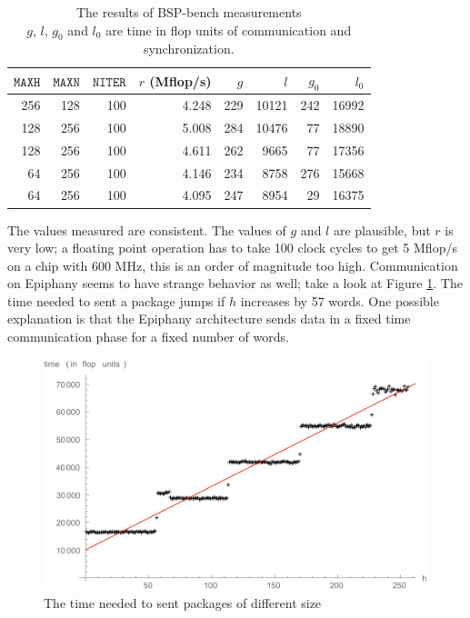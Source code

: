 \documentclass[fleqn]{article}
\renewcommand{\(}{\left(}
\renewcommand{\)}{\right)}
\begin{document}
\begin{table}[h]
\centering
\begin{tabular}{rrr|rrrrr}
$\mathtt{MAXH}$ & $\mathtt{MAXN}$ & $\mathtt{NITER}$ & $r$ (Mflop/s) & $g$ & $l$ & $g_0$ & $l_0$ \\
\hline
256 & 128 & 100 & 4.248 & 229 & 10121 & 242 & 16992 \\
128 & 256 & 100 & 5.008 & 284 & 10476 &  77 & 18890 \\
128 & 256 & 100 & 4.611 & 262 &  9665 &  77 & 17356 \\
 64 & 256 & 100 & 4.146 & 234 &  8758 & 276 & 15668 \\
 64 & 256 & 100 & 4.095 & 247 &  8954 &  29 & 16375 \\
\end{tabular}
\caption{The results of BSP-bench measurements\\ $g$, $l$, $g_0$ and $l_0$ are time in flop units of communication and synchronization.}
\end{table}

The values measured are consistent. The values of $g$ and $l$ are plausible, but $r$ is very low; a floating point operation has to take 100 clock cycles to get 5 Mflop/s on a chip with 600 MHz, this is an order of magnitude too high. Communication on Epiphany seems to have strange behavior as well; take a look at Figure \ref{fig:bspbench}. The time needed to sent a package jumps if $h$ increases by 57 words. One possible explanation is that the Epiphany architecture sends data in a fixed time communication phase for a fixed number of words.

\begin{centering}
\begin{figure}[h!]
\centering
\includegraphics[scale=0.8]{EpiphanyGandL.pdf}
\caption{The time needed to sent packages of different size}
\label{fig:bspbench}
\end{figure}
\end{centering}
\end{document}
